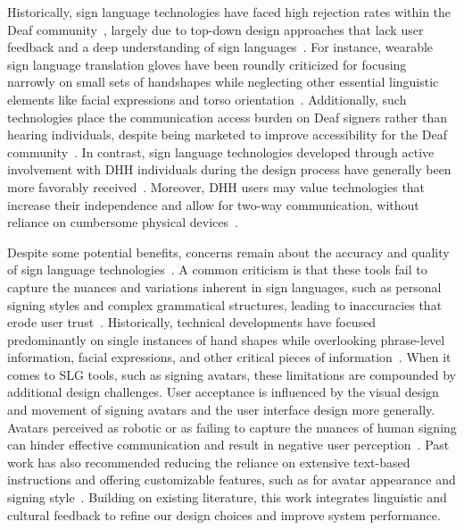 Historically, sign language technologies have faced high rejection rates within the Deaf community~\cite{Hsu2024unintel,vogel2024factors,gugenheimer2017impact}, largely due to top-down design approaches that lack user feedback and a deep understanding of sign languages~\cite{kipp2011assessing,mohr2017three,zhang2024illuminating,prietch2022systematic}. For instance, wearable sign language translation gloves have been roundly criticized for focusing narrowly on small sets of handshapes while neglecting other essential linguistic elements like facial expressions and torso orientation~\cite{michael2017why}. Additionally, such technologies place the communication access burden on Deaf signers rather than hearing individuals, despite being marketed to improve accessibility for the Deaf community~\cite{visual2019}. In contrast, sign language technologies developed through active involvement with DHH individuals during the design process have generally been more favorably received~\cite{inan2024generating,kipp2011assessing,boudreault2024closed,anindhita2016designing,kipp2011sign}. Moreover, DHH users may value technologies that increase their independence and allow for two-way communication, without reliance on cumbersome physical devices~\cite{michael2017why,hill2020deaf}.

Despite some potential benefits, concerns remain about the accuracy and quality of sign language technologies~\cite{lee2021american,kipp2011sign,huenerfauth2009linguistically,kipp2011assessing,ebling2016building}. A common criticism is that these tools fail to capture the nuances and variations inherent in sign languages, such as personal signing styles and complex grammatical structures, leading to inaccuracies that erode user trust~\cite{kipp2011assessing,lee2021american,kipp2011sign,huenerfauth2009linguistically,ebling2016building}. Historically, technical developments have focused predominantly on single instances of hand shapes while overlooking phrase-level information, facial expressions, and other critical pieces of information~\cite{ebling2016building,huenerfauth2009linguistically,kipp2011assessing}. When it comes to SLG tools, such as signing avatars, these limitations are compounded by additional design challenges. User acceptance is influenced by the visual design and movement of signing avatars and the user interface design more generally. Avatars perceived as robotic or as failing to capture the nuances of human signing can hinder effective communication and result in negative user perception~\cite{kipp2011assessing,tran2023us,huenerfauth2009sign,quandt2022attitudes}. Past work has also recommended reducing the reliance on extensive text-based instructions and offering customizable features, such as for avatar appearance and signing style~\cite{quandt2022attitudes,muir2005perception,tran2023us}. Building on existing literature, this work integrates linguistic and cultural feedback to refine our design choices and improve system performance.